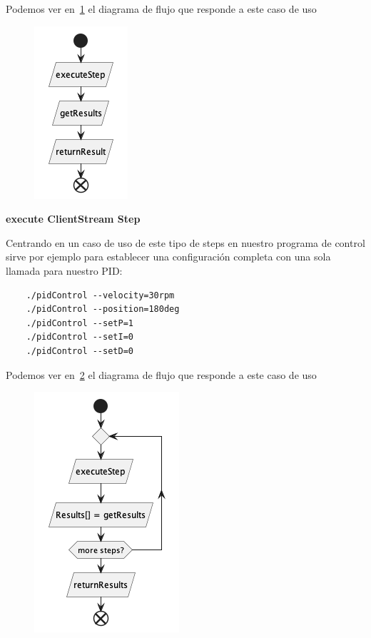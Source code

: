 Podemos ver en~\ref{fig:executeUnaryStep} el diagrama de flujo que responde a este caso de uso

\begin{figure}[H]
    \centering
    \includegraphics[height=0.2\textheight]{./part/Proyecto_ejecutivo/memoria_descriptiva/descripcionDelProyecto/client/uml/executeUnaryStep}
    \caption[Diagrama de objetos de dominio]{}\label{fig:executeUnaryStep}
\end{figure}

\textbf{execute ClientStream Step}

Centrando en un caso de uso de este tipo de steps en nuestro programa de control sirve por ejemplo para establecer una configuración completa con una sola llamada para nuestro PID:
\begin{verbatim}
    ./pidControl --velocity=30rpm
    ./pidControl --position=180deg
    ./pidControl --setP=1
    ./pidControl --setI=0
    ./pidControl --setD=0
\end{verbatim}

Podemos ver en~\ref{fig:executeClientStreamStep} el diagrama de flujo que responde a este caso de uso

\begin{figure}[H]
    \centering
    \includegraphics[height=0.2\textheight]{./part/Proyecto_ejecutivo/memoria_descriptiva/descripcionDelProyecto/client/uml/executeClientStreamStep}
    \caption[Diagrama de objetos de dominio]{}\label{fig:executeClientStreamStep}
\end{figure}

